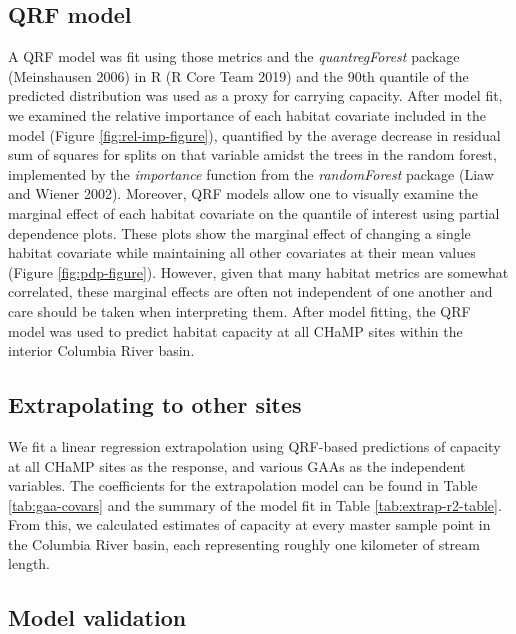 \documentclass[
  12pt,
]{article}
\begin{document}
\hypertarget{qrf-model}{%
\subsection{QRF model}\label{qrf-model}}

A QRF model was fit using those metrics and the \emph{quantregForest} package (Meinshausen 2006) in R (R Core Team 2019) and the 90th quantile of the predicted distribution was used as a proxy for carrying capacity. After model fit, we examined the relative importance of each habitat covariate included in the model (Figure \ref{fig:rel-imp-figure}), quantified by the average decrease in residual sum of squares for splits on that variable amidst the trees in the random forest, implemented by the \emph{importance} function from the \emph{randomForest} package (Liaw and Wiener 2002). Moreover, QRF models allow one to visually examine the marginal effect of each habitat covariate on the quantile of interest using partial dependence plots. These plots show the marginal effect of changing a single habitat covariate while maintaining all other covariates at their mean values (Figure \ref{fig:pdp-figure}). However, given that many habitat metrics are somewhat correlated, these marginal effects are often not independent of one another and care should be taken when interpreting them. After model fitting, the QRF model was used to predict habitat capacity at all CHaMP sites within the interior Columbia River basin.

\hypertarget{extrapolating-to-other-sites-1}{%
\subsection{Extrapolating to other sites}\label{extrapolating-to-other-sites-1}}

We fit a linear regression extrapolation using QRF-based predictions of capacity at all CHaMP sites as the response, and various GAAs as the independent variables. The coefficients for the extrapolation model can be found in Table \ref{tab:gaa-covars} and the summary of the model fit in Table \ref{tab:extrap-r2-table}. From this, we calculated estimates of capacity at every master sample point in the Columbia River basin, each representing roughly one kilometer of stream length.

\hypertarget{model-validation-1}{%
\subsection{Model validation}\label{model-validation-1}}
\end{document}
